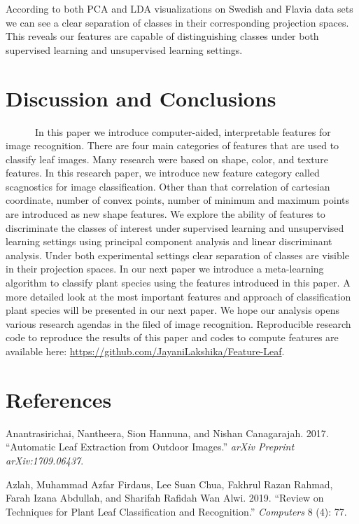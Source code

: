 \documentclass{article}
\begin{document}
According to both PCA and LDA visualizations on Swedish and Flavia data
sets we can see a clear separation of classes in their corresponding
projection spaces. This reveals our features are capable of
distinguishing classes under both supervised learning and unsupervised
learning settings.

\hypertarget{discussion-and-conclusions}{%
\section{Discussion and Conclusions}\label{discussion-and-conclusions}}

~~~~~~In this paper we introduce computer-aided, interpretable features
for image recognition. There are four main categories of features that
are used to classify leaf images. Many research were based on shape,
color, and texture features. In this research paper, we introduce new
feature category called scagnostics for image classification. Other than
that correlation of cartesian coordinate, number of convex points,
number of minimum and maximum points are introduced as new shape
features. We explore the ability of features to discriminate the classes
of interest under supervised learning and unsupervised learning settings
using principal component analysis and linear discriminant analysis.
Under both experimental settings clear separation of classes are visible
in their projection spaces. In our next paper we introduce a
meta-learning algorithm to classify plant species using the features
introduced in this paper. A more detailed look at the most important
features and approach of classification plant species will be presented
in our next paper. We hope our analysis opens various research agendas
in the filed of image recognition. Reproducible research code to
reproduce the results of this paper and codes to compute features are
available here: \url{https://github.com/JayaniLakshika/Feature-Leaf}.

\hypertarget{references}{%
\section*{References}\label{references}}

\hypertarget{refs}{}
\leavevmode\hypertarget{ref-DBLP}{}%
Anantrasirichai, Nantheera, Sion Hannuna, and Nishan Canagarajah. 2017.
``Automatic Leaf Extraction from Outdoor Images.'' \emph{arXiv Preprint
arXiv:1709.06437}.

\leavevmode\hypertarget{ref-articlepl}{}%
Azlah, Muhammad Azfar Firdaus, Lee Suan Chua, Fakhrul Razan Rahmad,
Farah Izana Abdullah, and Sharifah Rafidah Wan Alwi. 2019. ``Review on
Techniques for Plant Leaf Classification and Recognition.''
\emph{Computers} 8 (4): 77.
\end{document}
